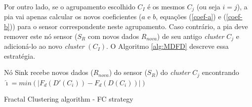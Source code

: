\documentclass{acm_proc_article-sp}
\begin{document}
Por outro lado, se o agrupamento escolhido $C_I$ é os mesmos $C_j$ (ou seja 
$ i = j $), a pia vai apenas calcular os novos coeficientes ($a$ e $b$, equações 
(\ref {coef-a}) e (\ref {coef-b})) para o sensor correspondente neste agrupamento. 
Caso contrário, a pia deve remover este nó sensor ($S_{R}$ com novos dados 
$R_{nova}$) de seu antigo {\it cluster} $C_j$ e adicioná-lo ao novo {\it cluster} $(C_I)$.
O Algoritmo \ref{alg:MDFD} descreve essa estratégia.
\vspace*{-.3cm}

\begin{algorithm}
 \SetAlgoLined
 \LinesNumbered
 \small
  Nó Sink recebe novos dados ($R_{nova}$) do sensor ($S_{R}$) do {\it cluster} $C_j$\;
   encontrando $\hat{\imath} = min(|F_d(D'(C_i)) - F_d(D(C_i))|)$\;
 \caption{Fractal Clustering algorithm - FC strategy}
 \label{alg:MDFD}
\end{algorithm}
\end{document}
